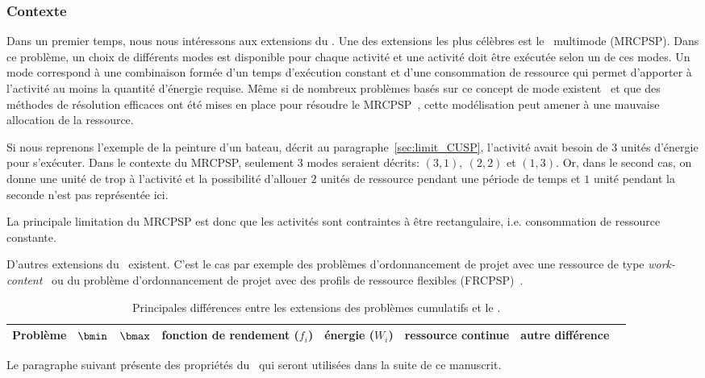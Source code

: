 \subsubsection{Contexte}


Dans un premier temps, nous nous intéressons aux extensions du
\RCPSP. Une des extensions les plus célèbres est le \RCPSP~multimode 
(MRCPSP). Dans ce problème, un choix de différents modes est
disponible pour chaque activité et une activité doit être exécutée
selon un de ces modes. Un mode correspond à une combinaison formée
d'un temps d'exécution constant et d'une consommation de ressource qui
permet d'apporter à l'activité au moins la quantité d'énergie
requise. Même si de nombreux problèmes basés sur ce concept de mode
existent~\cite{DDH,RK,RDK,DD} et que des méthodes de résolution
efficaces ont été mises en place pour résoudre le MRCPSP~\cite{PV},
cette modélisation peut amener à une mauvaise allocation de la
ressource. 

Si nous reprenons l'exemple de la peinture d'un bateau,
décrit au paragraphe~\ref{sec:limit_CUSP}, l'activité avait besoin de
$3$ unités d'énergie pour s'exécuter. Dans le contexte du MRCPSP,
seulement $3$ modes seraient décrits: $(3,1),\ (2,2)$ et $(1,3)$. Or,
dans le second cas, on donne une unité de trop à l'activité et la
possibilité d'allouer $2$ unités de ressource pendant une période de
temps et $1$ unité pendant la seconde n'est pas représentée ici. 

La principale limitation du MRCPSP est donc que les activités sont
contraintes à être rectangulaire, i.e. consommation de ressource
constante. 

D'autres extensions du \RCPSP~existent. C'est le cas par exemple des
problèmes d'ordonnancement de projet avec une ressource de type {\it
  work-content}~\cite{FT} ou du problème d'ordonnancement de projet
avec des profils de ressource flexibles (FRCPSP)~\cite{NK}. 


\begin{table}[!htb]
  \centering
  \begin{tabular}{|c|cc>{\centering\arraybackslash} p{2cm}>{\centering\arraybackslash} p{2cm}>{\centering\arraybackslash} p{2cm}>{\centering\arraybackslash} p{2cm}>{\centering\arraybackslash} p{2cm}|}
    \hline    
    Problème & $\bmin$ & $\bmax$ & fonction de rendement ($f_i$) &
                                                                 énergie
                                                                   ($W_i$)
    & ressource continue & autre différence \\
\hline
    

  \end{tabular}
  \caption{Principales différences entre les extensions des problèmes
    cumulatifs et le \CECSP.}
  \label{tab:dif_CECSP}
\end{table}
Le paragraphe suivant présente des propriétés du \CECSP~qui seront 
utilisées dans la suite de ce manuscrit. 


